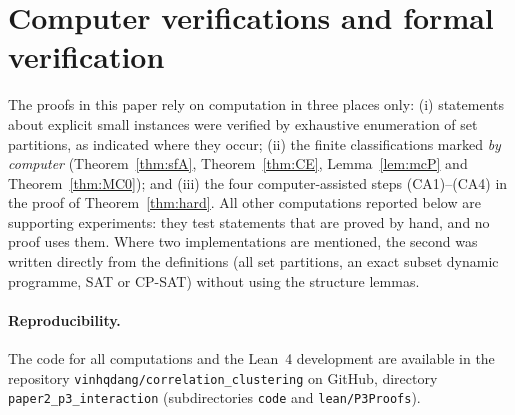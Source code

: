 \section{Computer verifications and formal verification}\label{app:checks}
The proofs in this paper rely on computation in three places only: (i) statements about explicit small instances were verified by exhaustive enumeration of set partitions, as indicated where they occur; (ii) the finite classifications marked \emph{by computer} (Theorem~\ref{thm:sfA}, Theorem~\ref{thm:CE}, Lemma~\ref{lem:mcP} and Theorem~\ref{thm:MC0}); and (iii) the four computer-assisted steps (CA1)--(CA4) in the proof of Theorem~\ref{thm:hard}. All other computations reported below are supporting experiments: they test statements that are proved by hand, and no proof uses them. Where two implementations are mentioned, the second was written directly from the definitions (all set partitions, an exact subset dynamic programme, SAT or CP-SAT) without using the structure lemmas.

\paragraph{Reproducibility.} The code for all computations and the Lean~4 development are available in the repository \texttt{vinhqdang/correlation\_clustering} on GitHub, directory \texttt{paper2\_p3\_interaction} (subdirectories \texttt{code} and \texttt{lean/P3Proofs}).

